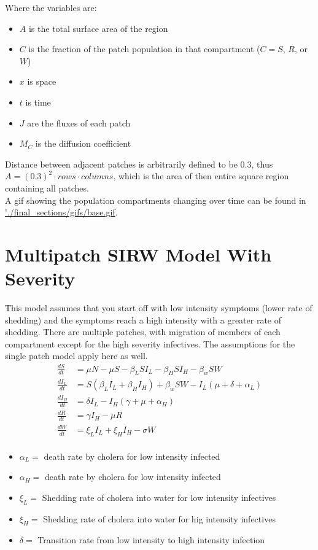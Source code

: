 \documentclass[12pt]{article}\usepackage[]{graphicx}\usepackage[]{color}
\begin{document}
Where the variables are:
\begin{itemize}
    \item $A$ is the total surface area of the region
    \item $C$ is the fraction of the patch population in that compartment ($C = S$, $R$, or $W$)
    \item $x$ is space
    \item $t$ is time
    \item $J$ are the fluxes of each patch
    \item $M_C$ is the diffusion coefficient
\end{itemize}
Distance between adjacent patches is arbitrarily defined to be $0.3$, thus $A= (0.3)^2 \cdot rows \cdot columns$, which is the area of then entire square region containing all patches.\\
A gif showing the population compartments changing over time can be found in \url{'./final_sections/gifs/base.gif}.
\section{Multipatch SIRW Model With Severity}

This model assumes that you start off with low intensity symptoms (lower rate of shedding) and the symptoms reach a high intensity with a greater rate of shedding.
There are multiple patches, with migration of members of each compartment except for the high severity infectives.
The assumptions for the single patch model apply here as well.
\begin{align*}
    \frac{dS}{dt}&= \mu N - \mu S - \beta_L S I_L - \beta_H S I_H - \beta_w S W  \\
    \frac{dI_L}{dt}&= S(\beta_L I_L + \beta_H I_H) + \beta_w S W - I_L (\mu + \delta + \alpha_L) \\
    \frac{dI_H}{dt}&= \delta I_L - I_H (\gamma + \mu + \alpha_H) \\
    \frac{dR}{dt}&= \gamma I_H - \mu R \\
    \frac{dW}{dt}&= \xi_L I_L + \xi_H I_H  - \sigma W\\
\end{align*}
\begin{itemize}
	\item $\alpha_L=$ death rate by cholera for low intensity infected
	\item $\alpha_H=$ death rate by cholera for low intensity infected
    \item $\xi_L=$ Shedding rate of cholera into water for low intensity infectives
    \item $\xi_H=$ Shedding rate of cholera into water for hig intensity infectives
	\item $\delta=$ Transition rate from low intensity to high intensity infection
\end{itemize}
\end{document}
